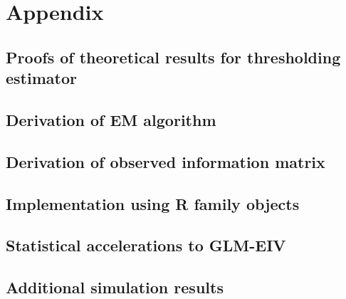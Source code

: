 \documentclass[12pt]{article}
\begin{document}
\section{Appendix}


\subsection{Proofs of theoretical results for thresholding estimator}

\subsection{Derivation of EM algorithm}

\subsection{Derivation of observed information matrix}

\subsection{Implementation using R family objects}

\subsection{Statistical accelerations to GLM-EIV}

\subsection{Additional simulation results}



\end{document}
